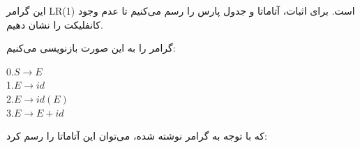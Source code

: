 


این گرامر LR(1) است. برای اثبات، آتاماتا و جدول پارس را رسم می‌کنیم تا عدم وجود کانفلیکت را نشان دهیم.

گرامر را به این صورت بازنویسی می‌کنیم:

\begin{center}
\begin{latin}
0.$S \rightarrow E$
\\
1.$E \rightarrow id$
\\
2.$E \rightarrow id(E)$
\\
3.$E \rightarrow E+id$
\end{latin}
\end{center}

که با توجه به گرامر نوشته شده، می‌توان این آتاماتا را رسم کرد:

